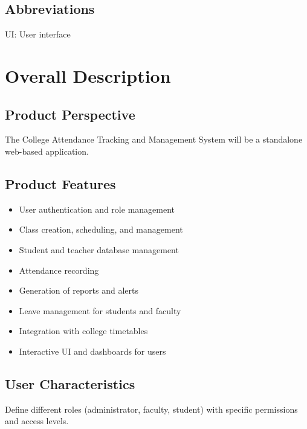 \documentclass{article}
\begin{document}
\subsection*{\Large{Abbreviations}}
\begin{large}
UI: User interface
\end{large}

\section*{\huge{Overall Description}}

\subsection*{\Large{Product Perspective}}
\begin{large}
The College Attendance Tracking and Management System will be a standalone web-based application.
\end{large}

\subsection*{\Large{Product Features}}
\begin{large}
\begin{itemize}[label={--}]
    \item User authentication and role management
    \item Class creation, scheduling, and management
    \item Student and teacher database management
    \item Attendance recording
    \item Generation of reports and alerts
    \item Leave management for students and faculty
    \item Integration with college timetables
    \item Interactive UI and dashboards for users
\end{itemize}
\end{large}

\subsection*{\Large{User Characteristics}}
\begin{large}
Define different roles (administrator, faculty, student) with specific permissions and access levels.
\end{large}
\end{document}
